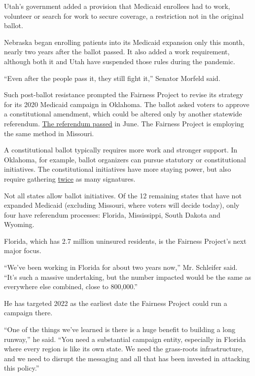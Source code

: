 Utah's government added a provision that Medicaid enrollees had to work,
volunteer or search for work to secure coverage, a restriction not in
the original ballot.

Nebraska began enrolling patients into its Medicaid expansion only this
month, nearly two years after the ballot passed. It also added a work
requirement, although both it and Utah have suspended those rules during
the pandemic.

``Even after the people pass it, they still fight it,'' Senator Morfeld
said.

Such post-ballot resistance prompted the Fairness Project to revise its
strategy for its 2020 Medicaid campaign in Oklahoma. The ballot asked
voters to approve a constitutional amendment, which could be altered
only by another statewide referendum.
\href{https://www.nytimes.com/2020/07/01/upshot/oklahoma-obamacare-Republican-voters-expand.html}{The
referendum passed} in June. The Fairness Project is employing the same
method in Missouri.

A constitutional ballot typically requires more work and stronger
support. In Oklahoma, for example, ballot organizers can pursue
statutory or constitutional initiatives. The constitutional initiatives
have more staying power, but also require gathering
\href{https://ballotpedia.org/Laws_governing_the_initiative_process_in_Oklahoma}{twice}
as many signatures.

Not all states allow ballot initiatives. Of the 12 remaining states that
have not expanded Medicaid (excluding Missouri, where voters will decide
today), only four have referendum processes: Florida, Mississippi, South
Dakota and Wyoming.

Florida, which has 2.7 million uninsured residents, is the Fairness
Project's next major focus.

``We've been working in Florida for about two years now,'' Mr. Schleifer
said. ``It's such a massive undertaking, but the number impacted would
be the same as everywhere else combined, close to 800,000.''

He has targeted 2022 as the earliest date the Fairness Project could run
a campaign there.

``One of the things we've learned is there is a huge benefit to building
a long runway,'' he said. ``You need a substantial campaign entity,
especially in Florida where every region is like its own state. We need
the grass-roots infrastructure, and we need to disrupt the messaging and
all that has been invested in attacking this policy.''

